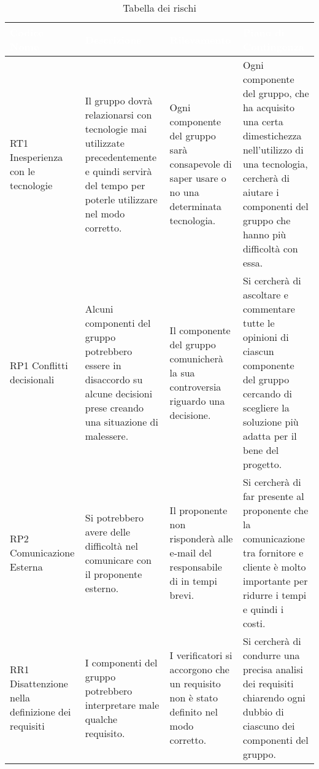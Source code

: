 {
\renewcommand{\arraystretch}{2}
\centering
\begin{longtable}{ C{2cm} C{4cm} C{4cm} C{4.9cm}}
\caption{Tabella dei rischi}\\
\textcolor{white}{\textbf{Codice Nome}} & 
\textcolor{white}{\textbf{Descrizione}} & 
\textcolor{white}{\textbf{Rilevamento}} &  
\textcolor{white}{\textbf{Piano di Contingenza}}\\	
\endhead

RT1 \newline Inesperienza con le tecnologie &
Il gruppo dovrà relazionarsi con tecnologie mai utilizzate precedentemente e quindi servirà del tempo per poterle utilizzare nel modo corretto. &
Ogni componente del gruppo sarà consapevole di saper usare o no una determinata tecnologia. &
Ogni componente del gruppo, che ha acquisito una certa dimestichezza nell'utilizzo di una tecnologia, cercherà di aiutare i componenti del gruppo che hanno più difficoltà con essa. \\

RP1 \newline Conflitti decisionali &
Alcuni componenti del gruppo potrebbero essere in disaccordo su alcune decisioni prese creando una situazione di malessere. &
Il componente del gruppo comunicherà la sua controversia riguardo una decisione. &
Si cercherà di ascoltare e commentare tutte le opinioni di ciascun componente del gruppo cercando di scegliere la soluzione più adatta per il bene del progetto. \\ 

RP2 \newline Comunicazione Esterna &
Si potrebbero avere delle difficoltà nel comunicare con il proponente esterno. &
Il proponente non risponderà alle e-mail del responsabile di \Gruppo{} in tempi brevi. &
Si cercherà di far presente al proponente \Proponente{} che la comunicazione tra fornitore e cliente è molto importante per ridurre i tempi e quindi i costi. \\

RR1 \newline Disattenzione nella definizione dei requisiti &
I componenti del gruppo potrebbero interpretare male qualche requisito. &
I verificatori si accorgono che un requisito non è stato definito nel modo corretto. &
Si cercherà di condurre una precisa analisi dei requisiti chiarendo ogni dubbio di ciascuno dei componenti del gruppo. \\


\end{longtable}}
